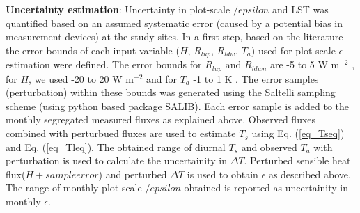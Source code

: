 \documentclass[fleqn,10pt]{wlscirep}
\begin{document}
{{\textbf{Uncertainty estimation}:
Uncertainty in plot-scale $/epsilon$ and LST was quantified based on an assumed systematic error (caused by a potential bias in measurement devices) at the study sites. 
In a first step, based on the literature \cite{trenberth2012tracking,foken2008energy} the error bounds of each input variable ($ H$, $R_{lup}$, $R_{ldw}$, $T_{a}$) used for plot-scale $\epsilon$ estimation were defined. The error bounds for $R_{lup}$ and $R_{ldwn}$ are -5 to 5 W m$^{-2}$ \cite{trenberth2012tracking}, for $H$, we used -20 to 20 W m$^{-2}$ and for $T_{a}$ -1 to 1 K \cite{foken2008energy}. The error samples (perturbation) within these bounds was generated using the Saltelli sampling scheme (using python based package SALIB\cite{saltelli2017new}). Each error sample is added to the monthly segregated measured fluxes as explained above. Observed fluxes combined with perturbued fluxes are used to estimate $T_{s}$ using Eq. (\ref{eq_Tseq}) and  Eq. (\ref{eq_Tleq}). The obtained range of diurnal $T_{s}$ and observed $T_{a}$ with perturbation is used to calculate the uncertainity in $\Delta T$. Perturbed sensible heat flux($H+ sample error$) and perturbed $\Delta T$ is used to obtain $\epsilon$ as described above.
The range of monthly plot-scale $/epsilon$ obtained is reported as uncertainity in monthly $\epsilon$. 

}}
\end{document}
